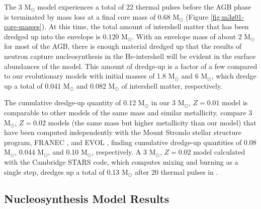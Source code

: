 The 3 M$_\odot$ model experiences a total of 22 thermal pulses before the AGB phase is terminated by mass loss at a final core mass of 0.68 M$_\odot$ (Figure \ref{fig:m3z01-core-masses}). At this time, the total amount of intershell matter that has been dredged up into the envelope is 0.120 M$_\odot$. With an envelope mass of about 2 M$_\odot$ for most of the AGB, there is enough material dredged up that the results of neutron capture nucleosynthesis in the He-intershell will be evident in the surface abundances of the model. This amount of dredge-up is a factor of a few compared to our evolutionary models with initial masses of 1.8 M$_\odot$ and 6 M$_\odot$, which dredge up a total of 0.041 M$_\odot$ and 0.082 M$_\odot$ of intershell matter, respectively. 

The cumulative dredge-up quantity of 0.12 M$_\odot$ in our 3 M$_\odot$, $Z=0.01$ model is comparable to other models of the same mass and similar metallicity. \citet{Lugaro:2003ew} compare 3 M$_\odot$, $Z=0.02$ models (the same mass but higher metallicity than our model) that have been computed independently with the Mount Stromlo stellar structure program, FRANEC \citep{Gallino:1998eg}, and EVOL \citep[as used by][with hydrodynamic overshoot included at all convective boundaries]{Herwig:2000ua}, finding cumulative dredge-up quantities of 0.08 M$_\odot$, 0.044 M$_\odot$, and 0.10 M$_\odot$, respectively. A 3 M$_\odot$, $Z=0.02$ model calculated with the Cambridge STARS code, which computes mixing and burning as a single step, dredges up a total of 0.13 M$_\odot$ after 20 thermal pulses in \citet{Stancliffe:2004ea}. 

\subsection{Nucleosynthesis Model Results}\label{sec:nucmodelresults}

